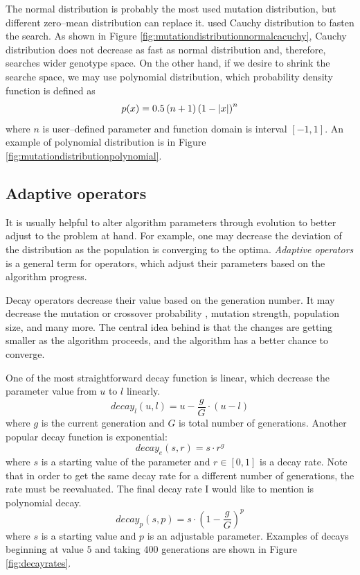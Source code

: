 The normal distribution is probably the most used mutation distribution, but different zero--mean distribution can replace it. \citet*{CauchyDistributionMutation} used Cauchy distribution to fasten the search. As shown in Figure \ref{fig:mutationdistributionnormalcacuchy}, Cauchy distribution does not decrease as fast as normal distribution and, therefore, searches wider genotype space. On the other hand, if we desire to shrink the searche space, we may use polynomial distribution, which probability density function is defined as
$$
p(x)=0.5 \left(n + 1\right)\left( 1 - \left|{x}\right| \right)^n
$$ 
where $n$ is user--defined parameter and function domain is interval $\left[-1,1\right]$. An example of polynomial distribution is in Figure \ref{fig:mutationdistributionpolynomial}.

\subsection{Adaptive operators}
\label{chap:adaptiveoperators}

It is usually helpful to alter algorithm parameters through evolution to better adjust to the problem at hand. For example, one may decrease the deviation of the distribution as the population is converging to the optima. \emph{Adaptive operators} is a general term for operators, which adjust their parameters based on the algorithm progress.

Decay operators decrease their value based on the generation number. It may decrease the mutation or crossover probability \citep{DecayGA}, mutation strength, population size, and many more. The central idea behind is that the changes are getting smaller as the algorithm proceeds, and the algorithm has a better chance to converge.

One of the most straightforward decay function is linear, which decrease the parameter value from $u$ to $l$ linearly.
$$
decay_l(u,l) = u - \frac{g}{G}\cdot\left( u - l \right)
$$
where $g$ is the current generation and $G$ is total number of generations. Another popular decay function is exponential:
$$
decay_e(s,r) = s\cdot r^g
$$
where $s$ is a starting value of the parameter and $r\in\left[0,1\right]$ is a decay rate. Note that in order to get the same decay rate for a different number of generations, the rate must be reevaluated.
The final decay rate I would like to mention is polynomial decay.
$$
decay_p(s,p) = s \cdot\left(1 - \frac{g}{G}\right)^p
$$
where $s$ is a starting value and $p$ is an adjustable parameter. Examples of decays beginning at value $5$ and taking $400$ generations are shown in Figure \ref{fig:decayrates}.


